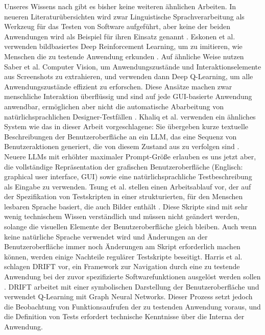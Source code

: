Unseres Wissens nach gibt es bisher keine weiteren ähnlichen Arbeiten.
In neueren Literaturübersichten wird zwar Linguistische Sprachverarbeitung als Werkzeug für das Testen von Software aufgeführt, aber keine der beiden Anwendungen wird als Beispiel für ihren Einsatz genannt \cite{implementation_verma_2023, machine_fontes_2021}.
Eskonen et al. verwenden bildbasiertes Deep Reinforcement Learning, um zu imitieren, wie Menschen die zu testende Anwendung erkunden \cite{deep_reinforcement_exploring}.
Auf ähnliche Weise nutzen Saber et al. Computer Vision, um Anwendungszustände und Interaktionselemente aus Screenshots zu extrahieren, und verwenden dann Deep Q-Learning, um alle Anwendungszustände effizient zu erforschen. 
Diese Ansätze machen zwar menschliche Interaktion überflüssig und sind auf jede GUI-basierte Anwendung anwendbar, ermöglichen aber nicht die automatische Abarbeitung von natürlichsprachlichen Designer-Testfällen \cite{saber_testing}.
Khaliq et al. verwenden ein ähnliches System wie das in dieser Arbeit vorgeschlagene: Sie übergeben kurze textuelle Beschreibungen der Benutzeroberfläche an ein LLM, das eine Sequenz von Benutzeraktionen generiert, die von diesem Zustand aus zu verfolgen sind \cite{transformers_exploratory}.
Neuere LLMs mit erhöhter maximaler Prompt-Größe erlauben es uns jetzt aber, die vollständige Repräsentation der grafischen Benutzeroberfläche (Englisch: graphical user interface, GUI) sowie eine natürlichsprachliche Testbeschreibung als Eingabe zu verwenden.
Tsung et al. stellen einen Arbeitsablauf vor, der auf der Spezifikation von Testskripten in einer strukturierten, für den Menschen lesbaren Sprache basiert, die auch Bilder enthält \cite{tsung}.
Diese Skripte sind mit sehr wenig technischem Wissen verständlich und müssen nicht geändert werden, solange die visuellen Elemente der Benutzeroberfläche gleich bleiben.
Auch wenn keine natürliche Sprache verwendet wird und Änderungen an der Benutzeroberfläche immer noch Änderungen am Skript erforderlich machen können, werden einige Nachteile regulärer Testskripte beseitigt.
Harris et al. schlagen DRIFT vor, ein Framework zur Navigation durch eine zu testende Anwendung bei der zuvor spezifizierte Softwarefunktionen ausgelöst werden sollen \cite{harries2020drift}.
DRIFT arbeitet mit einer symbolischen Darstellung der Benutzeroberfläche und verwendet Q-Learning mit Graph Neural Networks.
Dieser Prozess setzt jedoch die Beobachtung von Funktionsaufrufen der zu testenden Anwendung voraus, und die Definition von Tests erfordert technische Kenntnisse über die Interna der Anwendung.

